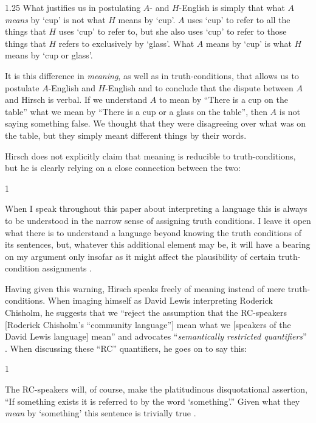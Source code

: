 \documentclass[12pt,twoside]{reedfancy}
\newenvironment{squote}{%
	\begin{spacing}{1}
	\begin{list}{}{%
	\setlength{\labelwidth}{0pt}%
	\rightmargin\leftmargin%
	}
	\item\relax
	}{%
	\end{list}%
	\end{spacing}
	}
\begin{document}
\begin{spacing}{1.25}
What justifies us in postulating $A$- and $H$-English is simply that
what $A$ {\em means} by `cup' is not what $H$ means by `cup'.  $A$
uses `cup' to refer to all the things that $H$ uses `cup' to refer to,
but she also uses `cup' to refer to those things that $H$ refers to
exclusively by `glass'.  What $A$ means by `cup' is what $H$ means by
`cup or glass'.

It is this difference in {\em meaning}, as well as in
truth-conditions, that allows us to postulate $A$-English and
$H$-English and to conclude that the dispute between $A$ and Hirsch is
verbal. If we understand $A$ to mean by ``There is a cup on the
table'' what we mean by ``There is a cup or a glass on the table'',
then $A$ is not saying something false.  We thought that they were
disagreeing over what was on the table, but they simply meant
different things by their words.

Hirsch does not explicitly claim that meaning is reducible to
truth-conditions, but he is clearly relying on a close connection
between the two:

\begin{squote}
When I speak throughout this paper about interpreting a language this
is always to be understood in the narrow sense of assigning truth
conditions.  I leave it open what there is to understand a language
beyond knowing the truth conditions of its sentences, but, whatever
this additional element may be, it will have a bearing on my argument
only insofar as it might affect the plausibility of certain
truth-condition assignments \citeyearpar[72]{hirsch2005}.
\end{squote}

Having given this warning, Hirsch speaks freely of meaning instead of
mere truth-conditions.  When imaging himself as David Lewis
interpreting Roderick Chisholm, he suggests that we ``reject the
assumption that the RC-speakers [Roderick Chisholm's ``community
  language''] mean what we [speakers of the David Lewis language]
mean'' \citeyearpar[76]{hirsch2005} and advocates ``{\em semantically
  restricted quantifiers}'' \citeyearpar[76, his
  emphasis]{hirsch2005}.  When discussing these ``RC'' quantifiers, he
goes on to say this:

\begin{squote}
The RC-speakers will, of course, make the platitudinous disquotational
assertion, ``If something exists it is referred to by the word
`something'.''  Given what they {\em mean} by `something' this
sentence is trivially true \citeyearpar[77, my emphasis]{hirsch2005}.
\end{squote}


\end{spacing}
\end{document}
